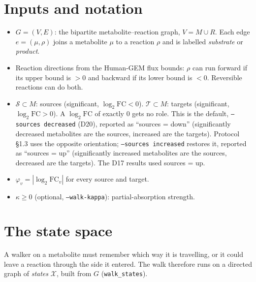 \documentclass[11pt]{article}
\newcommand{\code}[1]{\texttt{#1}}
\newcommand{\Sset}{\mathcal{S}}
\newcommand{\Tset}{\mathcal{T}}
\newcommand{\X}{\mathcal{X}}
\begin{document}
\section{Inputs and notation}

\begin{itemize}[nosep]
  \item $G=(V,E)$: the bipartite metabolite--reaction graph, $V=M\cup R$. Each edge
        $e=(\mu,\rho)$ joins a metabolite $\mu$ to a reaction $\rho$ and is labelled
        \emph{substrate} or \emph{product}.
  \item Reaction directions from the Human-GEM flux bounds: $\rho$ can run forward if
        its upper bound is $>0$ and backward if its lower bound is $<0$. Reversible
        reactions can do both.
  \item $\Sset\subset M$: sources (significant, $\log_2\mathrm{FC}<0$).
        $\Tset\subset M$: targets (significant, $\log_2\mathrm{FC}>0$).
        A $\log_2\mathrm{FC}$ of exactly 0 gets no role. This is the default,
        \code{--sources decreased} (D20), reported as ``sources = down''
        (significantly decreased metabolites are the sources, increased are the
        targets). Protocol \S1.3 uses the opposite orientation;
        \code{--sources increased} restores it, reported as ``sources = up''
        (significantly increased metabolites are the sources, decreased are the
        targets). The D17 results used sources = up.
  \item $\varphi_v = |\log_2\mathrm{FC}_v|$ for every source and target.
  \item $\kappa\ge 0$ (optional, \code{--walk-kappa}): partial-absorption strength.
\end{itemize}

\section{The state space}

A walker on a metabolite must remember which way it is travelling, or it could leave
a reaction through the side it entered. The walk therefore runs on a directed graph
of \emph{states} $\X$, built from $G$ (\code{walk\_states}).
\end{document}
